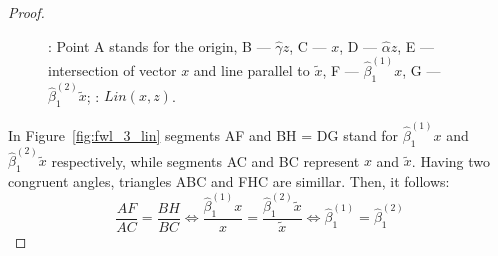 \documentclass[nobib]{tufte-handout}
\begin{document}
\begin{proof}
\begin{figure}[ht!]
\begin{center}
\hspace{4ex}
\caption{: Point A stands for the origin, B — $\hat\gamma z$, C — $x$, D — $\hat\alpha z$, E — intersection of vector $x$ and line parallel to $\tilde x$,
F — $\hat\beta_1^{(1)} x$, G — $\hat\beta_1^{(2)} \tilde{x}$; : $Lin(x,z)$.}
\end{center}
\end{figure}

In Figure~\ref{fig:fwl_3_lin} segments AF and BH = DG stand for $\hat\beta_1^{(1)}x$ and $\hat\beta_1^{(2)}\tilde x$ respectively,
while segments AC and BC represent $x$ and $\tilde{x}$. Having two congruent angles, triangles ABC and FHC are simillar.
Then, it follows:
\[
\frac{AF}{AC} = \frac{BH}{BC} \Leftrightarrow \frac{\hat\beta_1^{(1)}x}{x} = \frac{\hat\beta_1^{(2)}\tilde x}{\tilde x} \Leftrightarrow \hat\beta_1^{(1)} = \hat\beta_1^{(2)}
\]
\end{proof}



\end{document}
